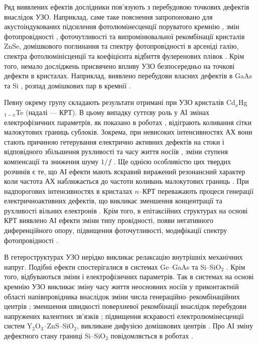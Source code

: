 Ряд виявлених ефектів дослідники пов'язують з перебудовою точкових дефектів внаслідок УЗО.
Наприклад, саме таке пояснення запропоновано для акустоіндукованих
підсилення фотолюмінесценції поруватого кремнію \cite{Bahar2003},
змін фотопровідності \cite{US:ZnSe},  фоточутливості та випромінювальної рекомбінації  \cite{ZobovFTP2008} кристалів ZnSe,
домішкового поглинання \cite{Zaver2007} та спектру фотопровідності \cite{UST:GaAs2015} в арсеніді галію,
спектра фотолюмінісценції та коефіцієнта відбиття фулеренових плівок \cite{RITTER2008}.
Крім того, немало досліджень присвячено впливу УЗО безпосередньо на точкові дефекти в кристалах.
Наприклад, виявлено перебудови  власних дефектів в GaAs \cite{Wosinski,Ostapenko1994,buyanova1994} та Si \cite{UST:Onanko},
розпад домішкових пар в кремнії \cite{Ostapenko1995SST,Ostapenko1995,Ostapenko1994APL}.


Певну окрему групу складають результати отримані при УЗО кристалів Cd$_x$Hg$_{1-x}$Te (надалі --- КРТ).
В цьому випадку суттєву роль у АІ змінах електрофізичних параметрів, як показано в роботах \cite{KRT:FTT89,KRT:FTT90}, відіграють коливання сітки малокутових границь сублоків.
Зокрема, при невисоких інтенсивностях АХ вони стають причиною гетерування електрично активних дефектів на стоки і відповідного збільшення рухливості та часу життя носіїв \cite{KRT:FTP90,Savkina:SPQEO2006}, зміни ступеня компенсації та зниження шуму $1/f$ \cite{Ol_Shav}.
Ще однією особливістю цих твердих розчинів є те, що АІ ефекти мають яскравий виражений резонансний характер коли частота АХ наближається до частоти коливань малокутових границь \cite{KRT:FTP90,KRT:FTT89,KRT:FTT90,Ol_Shav}.
При надпорогових інтенсивностях в кристалах $n$--КРТ переважають процеси генерації електричноактивних дефектів, що викликає зменшення концентрації та рухливості  вільних електронів \cite{KRT:FTP90,KRT:FTT89}.
Крім того, в епітаксійних структурах на основі КРТ виявлено АІ ефекти зміни типу провідності, появи негативного диференційного опору, підвищення фоточутливості, модифікації спектру фотопровідності \cite{Savkina:SST07,SavkinaPSSB2002}.


В гетероструктурах УЗО нерідко викликає релаксацію внутрішніх механічних напруг.
Подібні ефекти спостерігалися в системах Ge--GaAs \cite{BritunFTT,UST:GeGaAs1990} та Si--SiO$_2$ \cite{Zdeb1989}.
Крім того, відбуваються зміни і електрофізичних параметрів.
Так в системах  на основі кремнію УЗО викликає зміну часу життя неосновних носіїв у приконтактній області напівпровідника
внаслідок зміни числа генераційно--рекомбінаційних центрів \cite{Parchinskii2003r,Zdeb1989};
зменшення швидкості поверхневої рекомбінації внаслідок перебудови напружених валентних зв'язків \cite{Vlasov2009r,Parchinskii2003r};
підвищення яскравості електролюмінесценції систем Y$_2$O$_3$--ZnS--SiO$_2$, викликане дифузією домішкових центрів \cite{UST:ZnS}.
Про АІ зміну дефектного стану границі Si--SiO$_2$ повідомляється в роботах \cite{Ostap:SiO2,UST:Medvid}.


